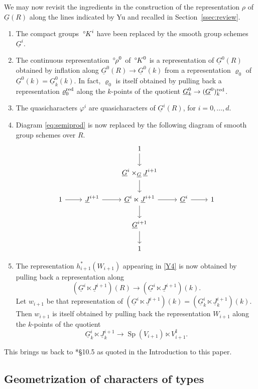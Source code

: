 \documentclass[10pt]{amsart}
\makeatletter
\theoremstyle{plain}
\theoremstyle{definition}
\newcommand{\Fq}{k}
\newcommand{\labitem}[2]{
\def\@itemlabel{\textbf{#1}}
\item
\def\@currentlabel{#1}\label{#2}}
\newcommand{\Sp}{{\operatorname{Sp}}}
\newcommand{\oK}{{\,^\circ \hskip-1pt K}}
\newcommand{\orho}{{\,^\circ \hskip-1pt \rho}}
\makeatother
\begin{document}
We may now revisit the ingredients in the construction of the representation $\rho$ of $\underline{G}(R)$ along the lines indicated by Yu and recalled in Section~\ref{ssec:review}.
\begin{enumerate}
\labitem{M0}{M0}
The compact groups $\oK^i$ have been replaced by the smooth group schemes $\underline{G}^i$.
\labitem{M1}{M1}
The continuous representation $\orho^0$ of $\oK^0$ is a representation of $\underline{G}^0(R)$ obtained by inflation along $\underline{G}^0(R) \to \underline{G}^0(\Fq)$ from a representation $\varrho_0$ of $\underline{G}^0(\Fq) = \underline{G}^0_\Fq(\Fq)$.
In fact, $\varrho_0$ is itself obtained by pulling back a representation $\varrho_0^{\operatorname{red}}$ along the $\Fq$-points of the quotient $\underline{G}^0_\Fq \to (\underline{G}^0)_\Fq^\reductive$.
\labitem{M2}{M2} The quasicharacters $\varphi^i$ are quasicharacters of $\underline{G}^i(R)$, for $i=0, \ldots, d$.
\labitem{M3}{M3}
Diagram \eqref{eq:semiprod} is now replaced by the following diagram of smooth group schemes over $R$.
\begin{equation}\label{eq:pimodel}
\begin{tikzcd}
\ && 1 \arrow{d} && \\
\ && \underline{G}^{i}\times_{\underline{G}} \underline{J}^{i+1}\arrow{d} && \\
1 \arrow{r} & \underline{J}^{i+1} \arrow{r} & \underline{G}^i \ltimes \underline{J}^{i+1} \arrow{d} \arrow{r} & \underline{G}^i \arrow{r} & 1\\
&& \underline{G}^{i+1} \arrow{d} && \\
&& 1 &&
\end{tikzcd}
\end{equation}
\labitem{M4}{M4}
The representation $h_{i+1}^*(W_{i+1})$ appearing in \ref{Y4} is now obtained by pulling back a representation along 
\[
(\underline{G}^i \ltimes \underline{J}^{i+1})(R) \to (\underline{G}^i \ltimes \underline{J}^{i+1})(\Fq).
\]
Let $w_{i+1}$ be that representation of $(\underline{G}^i \ltimes \underline{J}^{i+1})(\Fq) = (\underline{G}_\Fq^i \ltimes \underline{J}^{i+1}_\Fq)(\Fq)$. 
Then $w_{i+1}$ is itself obtained by pulling back the representation $W_{i+1}$ along the $\Fq$-points of the quotient
\[
\underline{G}_\Fq^i \ltimes \underline{J}^{i+1}_\Fq \to 
\Sp(V_{i+1}) \ltimes V_{i+1}^\sharp.
\]
\end{enumerate}

This brings us back to \cite{Yu:models}*{\S 10.5} as quoted in the Introduction to this paper.

\subsection{Geometrization of characters of types}\label{ssec:geotypes}
\end{document}
